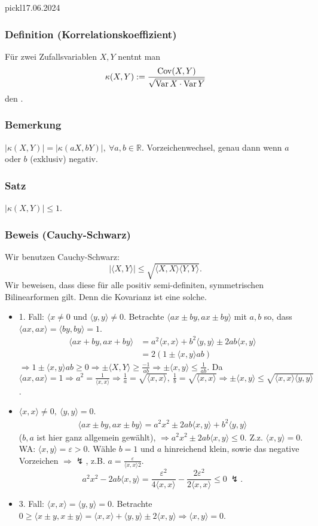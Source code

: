  pickl{17.06.2024}
\subsubsection{Definition (Korrelationskoeffizient)}
F\"ur zwei Zufallsvariablen $X,Y$ nentnt man
\[
\kappa(X,Y):=\frac{\operatorname{Cov}(X,Y)}{\sqrt{\operatorname{Var} X\cdot\operatorname{Var} Y}}
\]
den .
\subsubsection{Bemerkung}
$|\kappa(X,Y)|=|\kappa(aX,bY)|,\ \forall a,b\in\mathbb{R}$. Vorzeichenwechsel, genau dann wenn $a$ oder $b$ (exklusiv) negativ.
\subsubsection{Satz}
$|\kappa(X,Y)|\leq1$.
\subsubsection{Beweis (Cauchy-Schwarz)}
Wir benutzen Cauchy-Schwarz:
\[
|\langle X,Y\rangle|\leq\sqrt{\langle X,X\rangle\langle Y,Y\rangle}.
\]
Wir beweisen, dass diese f\"ur alle positiv semi-definiten, symmetrischen Bilinearformen gilt. Denn die Kovarianz ist eine solche.
\begin{itemize}
\item 1. Fall: $\langle x\neq0$ und $\langle y,y\rangle\neq0$. Betrachte $\langle ax\pm by,ax\pm by\rangle$ mit $a,b$ so, dass $\langle ax,ax\rangle=\langle by,by\rangle=1$.
\begin{align*}
\langle ax+by,ax+by\rangle&=a^2\langle x,x\rangle + b^2\langle y,y\rangle\pm 2ab\langle x,y\rangle\\
&=2(1\pm\langle x,y\rangle ab)
\end{align*}
$\Rightarrow 1\pm\langle x,y\rangle ab\geq0\Rightarrow\pm\langle X,Y\rangle\geq\frac{-1}{ab}\Rightarrow\pm\langle x,y\rangle\leq\frac{1}{ab}$. Da $\langle ax,ax\rangle=1\Rightarrow a^2=\frac{1}{\langle x,x\rangle}\Rightarrow\frac{1}{a}=\sqrt{\langle x,x\rangle},\ \frac{1}{b}=\sqrt{\langle x,x\rangle}\Rightarrow\pm\langle x,y\rangle\leq\sqrt{\langle x,x\rangle\langle y,y\rangle}$.
\item $\langle x,x\rangle\neq0,\ \langle y,y\rangle=0$.
\begin{align*}
\langle ax\pm by,ax\pm by\rangle=a^2x^2\pm 2ab\langle x,y\rangle+b^2\langle y,y\rangle
\end{align*}
($b,a$ ist hier ganz allgemein gew\"ahlt), $\Rightarrow a^2x^2\pm2ab\langle x,y\rangle\leq0$. Z.z. $\langle x,y\rangle=0$. WA: $\langle x,y\rangle=\varepsilon>0$. W\"ahle $b=1$ und $a$ hinreichend klein, sowie das negative Vorzeichen $\Rightarrow\lightning$, z.B. $a=\frac{\varepsilon}{\langle x,x\rangle2}$.
\[
a^2x^2-2ab\langle x,y\rangle=\frac{\varepsilon^2}{4\langle x,x\rangle}-\frac{2\varepsilon^2}{2\langle x,x\rangle}\leq0\ \lightning.
\]
\item 3. Fall: $\langle x,x\rangle=\langle y,y\rangle=0$. Betrachte $0\geq\langle x\pm y,x\pm y\rangle=\langle x,x\rangle+\langle y,y\rangle\pm2\langle x,y\rangle\Rightarrow\langle x,y\rangle=0$.
\end{itemize}
